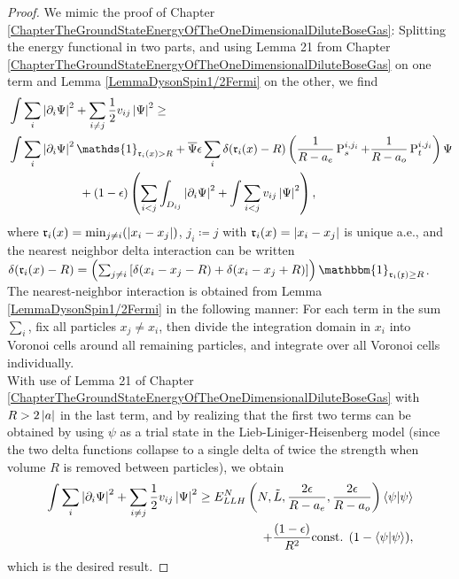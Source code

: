 \begin{proof}
	We mimic the proof of Chapter \ref{ChapterTheGroundStateEnergyOfTheOneDimensionalDiluteBoseGas}: Splitting the energy functional in two parts, and using Lemma 21 from Chapter \ref{ChapterTheGroundStateEnergyOfTheOneDimensionalDiluteBoseGas} on one term and Lemma \ref{LemmaDysonSpin1/2Fermi} on the other, we find 
	\begin{equation}
	\begin{aligned}
	&\int \sum_{i}\abs{\partial_i\Psi}^2+\sum_{i\neq j} \frac{1}{2}v_{ij}\abs{\Psi}^2\geq\\ &\int\sum_{i}\abs{\partial_i\Psi}^2\mathds{1}_{\mathfrak{r}_i(x)>R}+\overline{\Psi}\epsilon\sum_{i}\delta(\mathfrak{r}_i(x)-R)\left(\frac{1}{R-a_e}\operatorname{P}_s^{i,j_i}+\frac{1}{R-a_o}\operatorname{P}_t^{i,j_i}\right)\Psi\\&\qquad\qquad\qquad+ (1-\epsilon)\left(\sum_{i<j}\int_{D_{ij}}\abs{\partial_i \Psi}^2+\int\sum_{i<j} v_{ij} \abs{\Psi}^2\right),
	\end{aligned}
	\end{equation}
	where $ \mathfrak{r}_i(x)=\min_{j\neq i}(\left\lvert x_i-x_j \right\rvert) $, $ j_i\coloneqq j $ with $ \mathfrak{r}_i(x)=\left\lvert x_i-x_j \right\rvert $ is unique a.e., and the nearest neighbor delta interaction can be written $\delta(\mathfrak{r}_i(x)-R)=\left(\sum_{j\neq i}\left[\delta(x_i-x_j-R)+\delta(x_i-x_j+R)\right]\right)\mathbbm{1}_{\mathfrak{r_i(x)}\geq R}$. The nearest-neighbor interaction is obtained from Lemma \ref{LemmaDysonSpin1/2Fermi} in the following manner: For each term in the sum $ \sum_{i} $, fix all particles $ x_j\neq x_i $, then divide the integration domain in $ x_i $ into Voronoi cells around all remaining particles, and integrate over all Voronoi cells individually.\\
	With use of Lemma 21 of Chapter \ref{ChapterTheGroundStateEnergyOfTheOneDimensionalDiluteBoseGas} with $ R>2\left\lvert a \right\rvert $ in the last term, and by realizing that the first two terms can be obtained by using $ \psi $ as a trial state in the Lieb-Liniger-Heisenberg model (since the two delta functions collapse to a single delta of twice the strength when volume $R$ is removed between particles), we obtain\begin{equation*}
	\begin{aligned}
	\int \sum_{i}\left\lvert \partial_i\Psi \right\rvert^2+\sum_{i\neq j} \frac{1}{2}v_{ij}\left\lvert \Psi \right\rvert^2\geq E_{LLH}^N \left(N,\tilde{L},\frac{2\epsilon}{R-a_e},\frac{2\epsilon}{R-a_o}\right)\left\langle\psi|\psi\right\rangle\\+ \frac{(1-\epsilon)}{R^2}\textnormal{const. }(1-\left\langle\psi|\psi\right\rangle),
	\end{aligned}
	\end{equation*}
	which is the desired result.
\end{proof}
